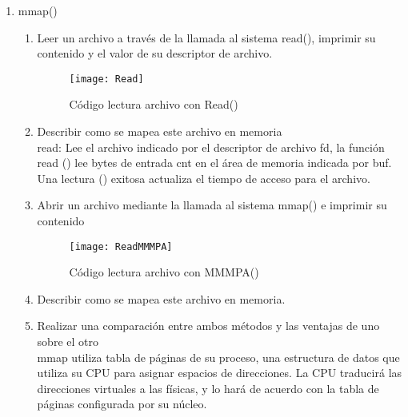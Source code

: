 \documentclass[a4paperx]{article}
\begin{document}
\begin{enumerate}

\item{mmap()}\\


\begin{enumerate}

\item{Leer un archivo a trav\'es de la llamada al sistema read(), imprimir su
contenido y el valor de su descriptor de archivo.}\\

\begin{flushright}
\begin{figure}[H]
\centering
\texttt{[image: Read]}
\caption{C\'odigo lectura archivo con Read()}
\end{figure}

\end{flushright}

\item{Describir como se mapea este archivo en memoria}\\

read: Lee el archivo indicado por el descriptor de archivo fd, la función read () lee bytes de entrada cnt en el área de memoria indicada por buf. Una lectura () exitosa actualiza el tiempo de acceso para el archivo.


\item{Abrir un archivo mediante la llamada al sistema mmap() e imprimir
su contenido}\\

\begin{flushright}
\begin{figure}[H]
\centering
\texttt{[image: ReadMMMPA]}
\caption{C\'odigo lectura archivo con MMMPA()}
\end{figure}

\end{flushright}

\item{Describir como se mapea este archivo en memoria.}\\

\item{Realizar una comparaci\'on entre ambos m\'etodos y las ventajas de uno
sobre el otro}\\

mmap utiliza tabla de páginas de su proceso, una estructura de datos que utiliza su CPU para asignar espacios de direcciones. La CPU traducirá las direcciones virtuales a las f\'isicas, y lo hará de acuerdo con la tabla de páginas configurada por su núcleo.


\end{enumerate}
\end{enumerate}
\end{document}
